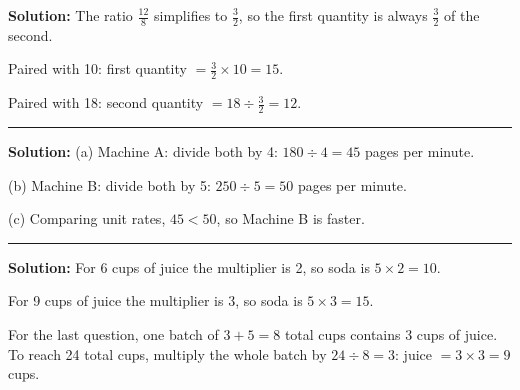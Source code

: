 \documentclass[12pt]{article}
\begin{document}
\textbf{Solution:} The ratio $\frac{12}{8}$ simplifies to $\frac{3}{2}$, so the
first quantity is always $\frac{3}{2}$ of the second.

Paired with 10: first quantity $= \frac{3}{2} \times 10 = 15$. 

Paired with 18: second quantity $= 18 \div \frac{3}{2} = 12$. 

\vspace{0.3cm}\noindent\rule{\linewidth}{0.2pt}\vspace{0.3cm}


\textbf{Solution:} (a) Machine A: divide both by 4: $180 \div 4 = 45$ pages per
minute. 

(b) Machine B: divide both by 5: $250 \div 5 = 50$ pages per minute. 

(c) Comparing unit rates, $45 < 50$, so Machine B is
faster. 

\vspace{0.3cm}\noindent\rule{\linewidth}{0.2pt}\vspace{0.3cm}


\textbf{Solution:} For 6 cups of juice the multiplier is 2, so soda is
$5 \times 2 = 10$. 

For 9 cups of juice the multiplier is 3, so soda is $5 \times 3 = 15$. 

For the last question, one batch of $3 + 5 = 8$ total cups contains 3 cups of
juice. To reach 24 total cups, multiply the whole batch by $24 \div 8 = 3$:
juice $= 3 \times 3 = 9$ cups. 
\end{document}
